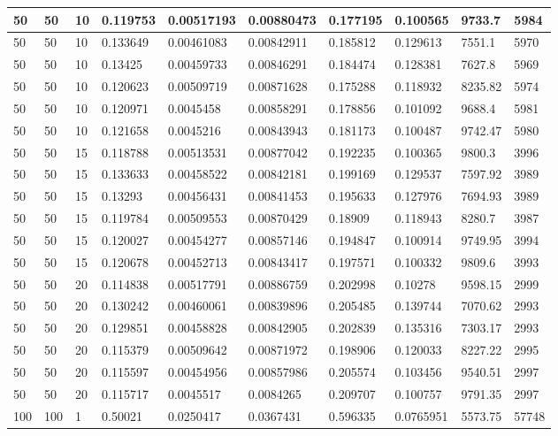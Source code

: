 \begin{landscape}
\begin{longtable}{ | l | l | l | l | l | l | l | l | l | l | }
50 & 50 & 10 & 0.119753 & 0.00517193 & 0.00880473 & 0.177195 & 0.100565 & 9733.7 & 5984\\ \hline
50 & 50 & 10 & 0.133649 & 0.00461083 & 0.00842911 & 0.185812 & 0.129613 & 7551.1 & 5970\\ \hline
50 & 50 & 10 & 0.13425 & 0.00459733 & 0.00846291 & 0.184474 & 0.128381 & 7627.8 & 5969\\ \hline
50 & 50 & 10 & 0.120623 & 0.00509719 & 0.00871628 & 0.175288 & 0.118932 & 8235.82 & 5974\\ \hline
50 & 50 & 10 & 0.120971 & 0.0045458 & 0.00858291 & 0.178856 & 0.101092 & 9688.4 & 5981\\ \hline
50 & 50 & 10 & 0.121658 & 0.0045216 & 0.00843943 & 0.181173 & 0.100487 & 9742.47 & 5980\\ \hline
50 & 50 & 15 & 0.118788 & 0.00513531 & 0.00877042 & 0.192235 & 0.100365 & 9800.3 & 3996\\ \hline
50 & 50 & 15 & 0.133633 & 0.00458522 & 0.00842181 & 0.199169 & 0.129537 & 7597.92 & 3989\\ \hline
50 & 50 & 15 & 0.13293 & 0.00456431 & 0.00841453 & 0.195633 & 0.127976 & 7694.93 & 3989\\ \hline
50 & 50 & 15 & 0.119784 & 0.00509553 & 0.00870429 & 0.18909 & 0.118943 & 8280.7 & 3987\\ \hline
50 & 50 & 15 & 0.120027 & 0.00454277 & 0.00857146 & 0.194847 & 0.100914 & 9749.95 & 3994\\ \hline
50 & 50 & 15 & 0.120678 & 0.00452713 & 0.00843417 & 0.197571 & 0.100332 & 9809.6 & 3993\\ \hline
50 & 50 & 20 & 0.114838 & 0.00517791 & 0.00886759 & 0.202998 & 0.10278 & 9598.15 & 2999\\ \hline
50 & 50 & 20 & 0.130242 & 0.00460061 & 0.00839896 & 0.205485 & 0.139744 & 7070.62 & 2993\\ \hline
50 & 50 & 20 & 0.129851 & 0.00458828 & 0.00842905 & 0.202839 & 0.135316 & 7303.17 & 2993\\ \hline
50 & 50 & 20 & 0.115379 & 0.00509642 & 0.00871972 & 0.198906 & 0.120033 & 8227.22 & 2995\\ \hline
50 & 50 & 20 & 0.115597 & 0.00454956 & 0.00857986 & 0.205574 & 0.103456 & 9540.51 & 2997\\ \hline
50 & 50 & 20 & 0.115717 & 0.0045517 & 0.0084265 & 0.209707 & 0.100757 & 9791.35 & 2997\\ \hline
100 & 100 & 1 & 0.50021 & 0.0250417 & 0.0367431 & 0.596335 & 0.0765951 & 5573.75 & 57748\\ \hline

\end{longtable}
\end{landscape}
